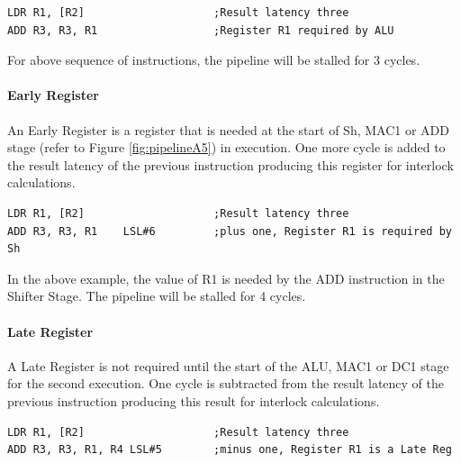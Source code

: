 \begin{Example}
\begin{lstlisting}
LDR R1, [R2]                    ;Result latency three
ADD R3, R3, R1                  ;Register R1 required by ALU
\end{lstlisting}
\end{Example}
\vspace*{-10pt}

For above sequence of instructions, the pipeline will be stalled for 3 cycles.

\vspace*{-10pt}
\paragraph{Early Register}
An Early Register is a register that is needed at the start of Sh, MAC1 or ADD stage (refer to Figure \ref{fig:pipelineA5}) in execution. One more cycle is added to the result latency of the previous instruction producing this register for interlock calculations.

\begin{Example}
\begin{lstlisting}
LDR R1, [R2]                    ;Result latency three
ADD R3, R3, R1    LSL#6         ;plus one, Register R1 is required by Sh
\end{lstlisting}
\end{Example}

In the above example, the value of R1 is needed by the ADD instruction in the Shifter Stage. The pipeline will be stalled for 4 cycles.

\vspace*{-10pt}
\paragraph{Late Register}
A Late Register is not required until the start of the ALU, MAC1 or DC1 stage for the second execution. One cycle is subtracted from the result latency of the previous instruction producing this result for interlock calculations.

\begin{Example}[h]
\begin{lstlisting}
LDR R1, [R2]                    ;Result latency three
ADD R3, R3, R1, R4 LSL#5        ;minus one, Register R1 is a Late Reg
\end{lstlisting}
\end{Example}

